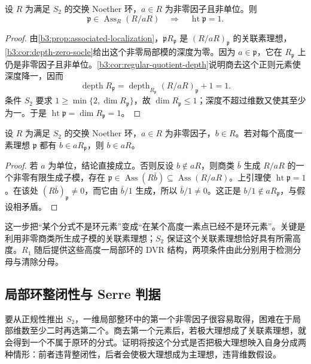 \begin{lemma}\label{b3:lem:s2-principal-associated-height}
	设 \(R\) 为满足 \(S_2\) 的交换 Noether 环，\(a\in R\) 为非零因子且非单位。则
	\[
		\mathfrak p\in\operatorname{Ass}_R(R/aR) \quad\Longrightarrow\quad\operatorname{ht}\mathfrak p=1.
	\]
\end{lemma}
\begin{proof}
	由\cref{b3:prop:associated-localization}，\(\mathfrak pR_{\mathfrak p}\) 是 \((R/aR)_{\mathfrak p}\) 的关联素理想，\cref{b3:cor:depth-zero-socle}给出这个非零局部模的深度为零。因为 \(a\in\mathfrak p\)，它在 \(R_{\mathfrak p}\) 上仍是非零因子且非单位。\cref{b3:cor:regular-quotient-depth}说明商去这个正则元素使深度降一，因而
	\[
		\operatorname{depth}R_{\mathfrak p} =\operatorname{depth}_{R_{\mathfrak p}}(R/aR)_{\mathfrak p}+1=1.
	\]
	条件 \(S_2\) 要求 \(1\ge\min\{2,\dim R_{\mathfrak p}\}\)，故 \(\dim R_{\mathfrak p}\le1\)；深度不超过维数又使其至少为一。于是 \(\operatorname{ht}\mathfrak p=\dim R_{\mathfrak p}=1\)。
\end{proof}

\begin{lemma}\label{b3:lem:s2-fraction-membership}
	设 \(R\) 为满足 \(S_2\) 的交换 Noether 环，\(a\in R\) 为非零因子，\(b\in R\)。若对每个高度一素理想 \(\mathfrak p\) 都有 \(b\in aR_{\mathfrak p}\)，则 \(b\in aR\)。
\end{lemma}
\begin{proof}
	若 \(a\) 为单位，结论直接成立。否则反设 \(b\notin aR\)，则商类 \(\bar b\) 生成 \(R/aR\) 的一个非零有限生成子模，存在 \(\mathfrak p\in\operatorname{Ass}(R\bar b)\subseteq\operatorname{Ass}(R/aR)\)。上引理使 \(\operatorname{ht}\mathfrak p=1\)。在该处 \((R\bar b)_{\mathfrak p}\ne0\)，而它由 \(\bar b/1\) 生成，所以 \(\bar b/1\ne0\)。这正是 \(b/1\notin aR_{\mathfrak p}\)，与假设相矛盾。
\end{proof}

这一步把“某个分式不是环元素”变成“在某个高度一素点已经不是环元素”。关键是利用非零商类所生成子模的关联素理想；\(S_2\) 保证这个关联素理想恰好具有所需高度。\(R_1\) 随后提供这些高度一局部环的 DVR 结构，两项条件由此分别用于检测分母与清除分母。

\subsection{局部环整闭性与 Serre 判据}
\label{b3:subsec:2002:02}

要从正规性推出 \(S_2\)，一维局部整环中的第一个非零因子很容易取得，困难在于局部维数至少二时再选第二个。商去第一个元素后，若极大理想成了关联素理想，就会得到一个不属于原环的分式。证明将按这个分式是否把极大理想映入自身分成两种情形：前者违背整闭性，后者会使极大理想成为主理想，违背维数假设。


